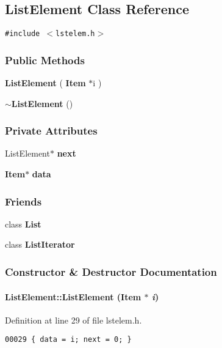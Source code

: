 \subsection{List\-Element  Class Reference}
\label{ListElement}
{\tt \#include $<$lstelem.h$>$}

\subsubsection*{Public Methods}
\begin{CompactItemize}
\item 
{\bf List\-Element} ( {\bf Item} $\ast$i )
\item 
{\bf $\sim$List\-Element} ()
\end{CompactItemize}
\subsubsection*{Private Attributes}
\begin{CompactItemize}
\item 
List\-Element$\ast$ {\bf next}
\item 
{\bf Item}$\ast$ {\bf data}
\end{CompactItemize}
\subsubsection*{Friends}
\begin{CompactItemize}
\item 
class {\bf List}
\item 
class {\bf List\-Iterator}
\end{CompactItemize}


\subsubsection{Constructor \& Destructor Documentation}
\label{ListElement_a0}
\paragraph{\setlength{\rightskip}{0pt plus 5cm}List\-Element::List\-Element ({\bf Item} $\ast$ {\em i})\hspace{0.3cm}{\tt  [inline]}}\hfill



Definition at line 29 of file lstelem.h.\small\begin{verbatim}00029 { data = i; next = 0; }
\end{verbatim}\normalsize 
\label{ListElement_a1}
